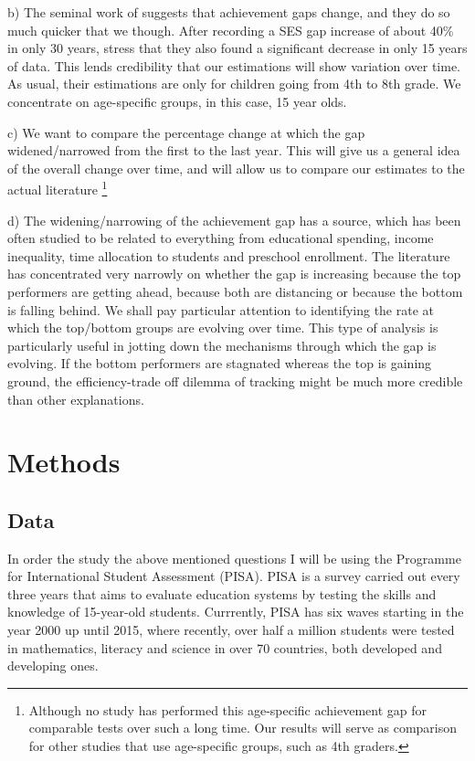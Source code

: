 \documentclass[11pt, a4paper]{article}\usepackage[]{graphicx}\usepackage[]{color}
\begin{document}
b) The seminal work of \citet{reardon2011} suggests that achievement gaps change, and they do so much quicker that we though. After recording a SES gap increase of about 40\% in only 30 years, \citep{reardon_portilla} stress that they also found a significant decrease in only 15 years of data. This lends credibility that our estimations will show variation over time. As usual, their estimations are only for children going from 4th to 8th grade. We concentrate on age-specific groups, in this case, 15 year olds.

c) We want to compare the percentage change at which the gap widened/narrowed from the first to the last year. This will give us a general idea of the overall change over time, and will allow us to compare our estimates to the actual literature \footnote{Although no study has performed this age-specific achievement gap for comparable tests over such a long time. Our results will serve as comparison for other studies that use age-specific groups, such as 4th graders.}

d) The widening/narrowing of the achievement gap has a source, which has been often studied to be related to everything from educational spending, income inequality, time allocation to students and preschool enrollment. The literature has concentrated very narrowly on whether the gap is increasing because the top performers are getting ahead, because both are distancing or because the bottom is falling behind. We shall pay particular attention to identifying the rate at which the top/bottom groups are evolving over time. This type of analysis is particularly useful in jotting down the mechanisms through which the gap is evolving. If the bottom performers are stagnated whereas the top is gaining ground, the efficiency-trade off dilemma of tracking might be much more credible than other explanations.

\section{Methods}

\subsection{Data}



In order the study the above mentioned questions I will be using the Programme for International Student Assessment (PISA). PISA is a survey carried out every three years that aims to evaluate education systems by testing the skills and knowledge of 15-year-old students. Currrently, PISA has six waves starting in the year 2000 up until 2015, where recently, over half a million students were tested in mathematics, literacy and science in over 70 countries, both developed and developing ones.
\end{document}
